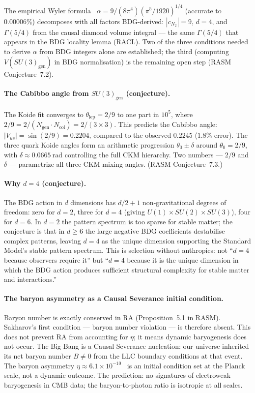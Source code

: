\documentclass[11pt,a4paper]{article}
\begin{document}
The empirical Wyler formula~\citep{Wyler1969} $\alpha = 9/(8\pi^4)(\pi^5/1920)^{1/4}$
(accurate to $0.00006\%$) decomposes with all factors BDG-derived: $|c_{N_2}| = 9$,
$d = 4$, and $\Gamma(5/4)$ from the causal diamond volume integral --- the same
$\Gamma(5/4)$ that appears in the BDG locality lemma (RACL). Two of the three
conditions needed to derive $\alpha$ from BDG integers alone are established;
the third (computing $V(SU(3)_{\mathrm{gen}})$ in BDG normalisation) is the
remaining open step (RASM Conjecture~7.2).

\paragraph{The Cabibbo angle from $SU(3)_{\mathrm{gen}}$ (conjecture).}
The Koide fit converges to $\theta_{\mathrm{lep}} = 2/9$ to one part in $10^5$,
where $2/9 = 2/(N_{\mathrm{gen}} \cdot N_{\mathrm{col}}) = 2/(3\times 3)$.
This predicts the Cabibbo angle: $|V_{us}| = \sin(2/9) = 0.2204$,
compared to the observed $0.2245$ ($1.8\%$ error).
The three quark Koide angles form an arithmetic progression
$\theta_0 \pm \delta$ around $\theta_0 = 2/9$,
with $\delta \approx 0.0665~\mathrm{rad}$ controlling the full CKM hierarchy.
Two numbers --- $2/9$ and $\delta$ --- parametrize all three CKM mixing angles.
(RASM Conjecture~7.3.)

\paragraph{Why $d = 4$ (conjecture).}
The BDG action in $d$ dimensions has $d/2 + 1$ non-gravitational degrees
of freedom: zero for $d = 2$, three for $d = 4$ (giving
$U(1)\times SU(2)\times SU(3)$), four for $d = 6$. In $d = 2$ the
pattern spectrum is too sparse for stable matter; the conjecture is that
in $d \geq 6$ the large negative BDG coefficients destabilise complex
patterns, leaving $d = 4$ as the unique dimension supporting the Standard
Model's stable pattern spectrum. This is selection without anthropics:
not ``$d = 4$ because observers require it'' but ``$d = 4$ because it is
the unique dimension in which the BDG action produces sufficient structural
complexity for stable matter and interactions.''

\paragraph{The baryon asymmetry as a Causal Severance initial condition.}
Baryon number is exactly conserved in RA (Proposition~5.1 in RASM).
Sakharov's first condition — baryon number violation — is therefore
absent. This does not prevent RA from accounting for $\eta$; it means
dynamic baryogenesis does not occur. The Big Bang is a Causal Severance
nucleation: our universe inherited its net baryon number $B \neq 0$
from the LLC boundary conditions at that event. The baryon asymmetry
$\eta \approx 6.1\times 10^{-10}$~\citep{PDG2022} is an initial
condition set at the Planck scale, not a dynamic outcome. The prediction:
no signatures of electroweak baryogenesis in CMB data; the
baryon-to-photon ratio is isotropic at all scales.
\end{document}
